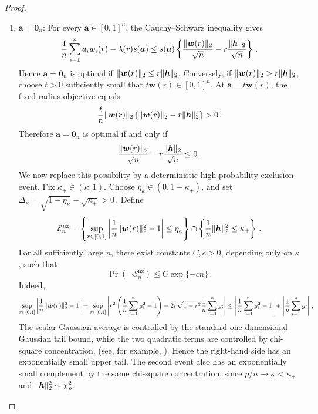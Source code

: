 \documentclass{article}
\makeatletter
\theoremstyle{definition}
\newcommand{\vnorm}[1]{%
	\ensuremath{%
		\if@display
		\left\| #1 \right\|
		\else
		\| #1 \|
		\fi
	}%
}
\newcommand*{\bb}{\boldsymbol}
\def\bh{\bb{h}}
\makeatother
\begin{document}
\begin{bibunit}
\begin{proof}
\begin{enumerate}[label=(\roman{*})]
\item 
		$\bb a=\bb0_n$: For every $\bb a\in[0,1]^n$, the
		Cauchy--Schwarz inequality gives
		$$
		\frac1n\sum_{i=1}^na_iw_i(r)-\lambda(r)s(\bb a)
		\leq
		s(\bb a)
		\left\{
		\frac{\vnorm{\bb w(r)}_2}{\sqrt n}
		-
		r\frac{\vnorm{\bb h}_2}{\sqrt n}
		\right\}\,.
		$$
		Hence $\bb a=\bb0_n$ is optimal if
		$\vnorm{\bb w(r)}_2\leq r\vnorm{\bb h}_2$. Conversely, if
		$\vnorm{\bb w(r)}_2>r\vnorm{\bb h}_2$, choose $t>0$ sufficiently
		small that $t\bb w(r)\in[0,1]^n$. At $\bb a=t\bb w(r)$, the
		fixed-radius objective equals
		$$
		\frac{t}{n}\vnorm{\bb w(r)}_2
		\left\{
		\vnorm{\bb w(r)}_2-r\vnorm{\bb h}_2
		\right\}
		>0\,.
		$$
		Therefore $\bb a=\bb0_n$ is optimal if and only if
		$$
		\frac{\vnorm{\bb w(r)}_2}{\sqrt n}
		-
		r\frac{\vnorm{\bb h}_2}{\sqrt n}
		\leq0\,.
		$$
		We now replace this possibility by a deterministic high-probability
		exclusion event.
			Fix $\kappa_+\in(\kappa,1)$. Choose
			$\eta_\kappa\in(0,1-\kappa_+)$, and set $\Delta_\kappa = \sqrt{1-\eta_\kappa}-\sqrt{\kappa_+}>0\,.$
			Define
			$$
			\mathcal E_n^{\mathrm{nz}}
			=
			\left\{
			\underset{r\in[0,1]}{\sup}
			\left|
			\frac{1}{n}\vnorm{\bb w(r)}_2^2-1
			\right|
			\leq \eta_\kappa
			\right\}
			\cap
			\left\{
			\frac{1}{n}\vnorm{\bh}_2^2\leq \kappa_+
			\right\} \,. 
			$$
			For all sufficiently large $n$, there exist constants $C,c>0$, depending
			only on $\kappa$, such that
			$$
			    \Pr\left(\lnot\mathcal E_n^{\mathrm{nz}}\right)
			    \leq
			    C\exp\{-cn\} \,. 
			$$
			Indeed,
			$$
			\begin{aligned}
			\underset{r \in [0,1]}{\sup}
			\left|
			\frac{1}{n}\vnorm{\bb w(r)}_2^2 -1
			\right|
			=
			\underset{r \in [0,1]}{\sup}
			\left|
			r^2\left(\frac{1}{n}\sum_{i=1}^n g_i^2-1\right)
			-
			2r\sqrt{1-r^2}\frac{1}{n}\sum_{i=1}^n g_i
			\right| \leq
			\left|
			\frac{1}{n}\sum_{i=1}^n g_i^2-1
			\right|
			+
			\left|
			\frac{1}{n}\sum_{i=1}^n g_i
			\right| \,,
			\end{aligned}
			$$
			The scalar Gaussian average is controlled by the standard one-dimensional
			Gaussian tail bound, while the two quadratic terms are controlled by
			chi-square concentration. (see, for example,
			\citealt[][Exercise~3.3.7 and Theorem~3.1.1]{vershynin:2018}). Hence the
			right-hand side has an exponentially small upper tail. The second event also
			has an exponentially small complement by the same chi-square concentration,
			since $p/n\to\kappa<\kappa_+$ and $\vnorm{\bh}_2^2\sim\chi_p^2$.
			

\end{enumerate}
\end{proof}
\end{bibunit}
\end{document}
